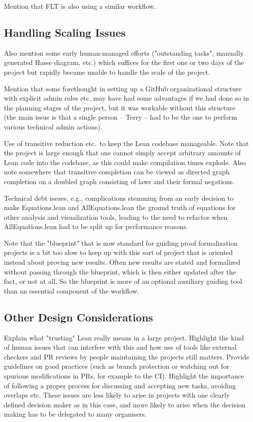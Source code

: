 Mention that FLT is also using a similar workflow.

\subsection{Handling Scaling Issues}

Also mention some early human-managed efforts ("outstanding tasks", manually generated Hasse diagram, etc.) which suffices for the first one or two days of the project but rapidly became unable to handle the scale of the project.

Mention that some forethought in setting up a GitHub organizational structure with explicit admin roles etc. may have had some advantages if we had done so in the planning stages of the project, but it was workable without this structure (the main issue is that a single person -- Terry -- had to be the one to perform various technical admin actions).

Use of transitive reduction etc.\ to keep the Lean codebase manageable. Note that the project is large enough that one cannot simply accept arbitrary amounts of Lean code into the codebase, as this could make compilation times explode. Also note somewhere that transitive completion can be viewed as directed graph completion on a doubled graph consisting of laws and their formal negations.

Technical debt issues, e.g., complications stemming from an early decision to make Equations.lean and AllEquations.lean the ground truth of equations for other analysis and visualization tools, leading to the need to refactor when AllEquations.lean had to be split up for performance reasons.

Note that the "blueprint" that is now standard for guiding proof formalization projects is a bit too slow to keep up with this sort of project that is oriented instead about proving new results. Often new results are stated and formalized without passing through the blueprint, which is then either updated after the fact, or not at all. So the blueprint is more of an optional auxiliary guiding tool than an essential component of the workflow.

\subsection{Other Design Considerations}

Explain what "trusting" Lean really means in a large project. Highlight the kind of human issues that can interfere with this and how use of tools like external checkers and PR reviews by people maintaining the projects still matters. Provide guidelines on good practices (such as branch protection or watching out for spurious modifications in PRs, for example to the CI). Highlight the importance of following a proper process for discussing and accepting new tasks, avoiding overlaps etc. These issues are less likely to arise in projects with one clearly defined decision maker as in this case, and more likely to arise when the decision making has to be delegated to many organisers.

